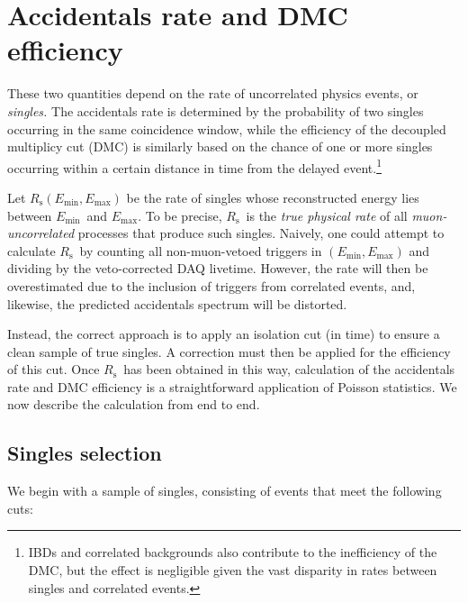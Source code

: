 \documentclass[../thesis.tex]{subfiles}
\begin{document}
\chapter{Accidentals rate and DMC efficiency}
\label{chap:accDMC}

These two quantities depend on the rate of uncorrelated physics events, or \emph{singles.} The accidentals rate is determined by the probability of two singles occurring in the same coincidence window, while the efficiency of the decoupled multiplicy cut (DMC) is similarly based on the chance of one or more singles occurring within a certain distance in time from the delayed event.\footnote{IBDs and correlated backgrounds also contribute to the inefficiency of the DMC, but the effect is negligible given the vast disparity in rates between singles and correlated events.}

\def\Emin{\ensuremath{E_\mathrm{min}}}
\def\Emax{\ensuremath{E_\mathrm{max}}}
\def\Rs{\ensuremath{R_\mathrm{s}}}

Let $\Rs(\Emin, \Emax)$ be the rate of singles whose reconstructed energy lies between \Emin\ and \Emax. To be precise, \Rs\ is the \emph{true physical rate} of all \emph{muon-uncorrelated} processes that produce such singles. Naively, one could attempt to calculate \Rs\ by counting all non-muon-vetoed triggers in $(\Emin, \Emax)$ and dividing by the veto-corrected DAQ livetime. However, the rate will then be overestimated due to the inclusion of triggers from correlated events, and, likewise, the predicted accidentals spectrum will be distorted.

Instead, the correct approach is to apply an isolation cut (in time) to ensure a clean sample of true singles. A correction must then be applied for the efficiency of this cut. Once \Rs\ has been obtained in this way, calculation of the accidentals rate and DMC efficiency is a straightforward application of Poisson statistics. We now describe the calculation from end to end.

\section{Singles selection}
\label{sec:singsel}

We begin with a sample of singles, consisting of events that meet the following cuts:

\end{document}
